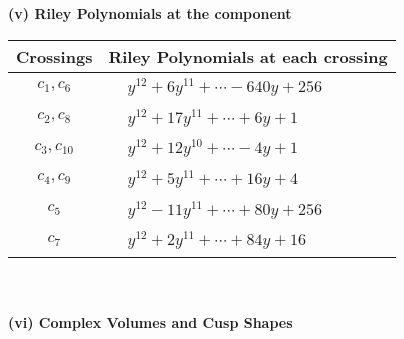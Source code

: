 \documentclass[1p]{elsarticle_modified}
\theoremstyle{definition}
\begin{document}
\newpage\renewcommand{\arraystretch}{1}
\flushleft \textbf{(v) Riley Polynomials at the component}\newline \\
\begin{tabular}{m{50pt}|m{274pt}}
Crossings & \hspace{64pt}Riley Polynomials at each crossing \\
\hline $$\begin{aligned}c_{1},c_{6}\end{aligned}$$&$\begin{aligned}
&y^{12}+6 y^{11}+\cdots-640 y+256
\end{aligned}$\\
\hline $$\begin{aligned}c_{2},c_{8}\end{aligned}$$&$\begin{aligned}
&y^{12}+17 y^{11}+\cdots+6 y+1
\end{aligned}$\\
\hline $$\begin{aligned}c_{3},c_{10}\end{aligned}$$&$\begin{aligned}
&y^{12}+12 y^{10}+\cdots-4 y+1
\end{aligned}$\\
\hline $$\begin{aligned}c_{4},c_{9}\end{aligned}$$&$\begin{aligned}
&y^{12}+5 y^{11}+\cdots+16 y+4
\end{aligned}$\\
\hline $$\begin{aligned}c_{5}\end{aligned}$$&$\begin{aligned}
&y^{12}-11 y^{11}+\cdots+80 y+256
\end{aligned}$\\
\hline $$\begin{aligned}c_{7}\end{aligned}$$&$\begin{aligned}
&y^{12}+2 y^{11}+\cdots+84 y+16
\end{aligned}$\\
\hline
\end{tabular}\\~\\
\newpage\flushleft \textbf{(vi) Complex Volumes and Cusp Shapes}
\end{document}
